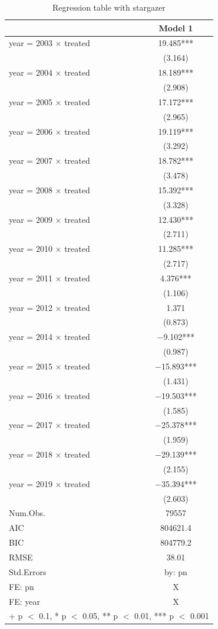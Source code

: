 \documentclass[
]{article}
\begin{document}
\begin{table}

\caption{\label{tab:table-4}Regression table with stargazer}
\centering
\begin{tabular}[t]{lc}
\toprule
  & Model 1\\
\midrule
year = 2003 × treated & \num{19.485}***\\
 & (\num{3.164})\\
year = 2004 × treated & \num{18.189}***\\
 & (\num{2.908})\\
year = 2005 × treated & \num{17.172}***\\
 & (\num{2.965})\\
year = 2006 × treated & \num{19.119}***\\
 & (\num{3.292})\\
year = 2007 × treated & \num{18.782}***\\
 & (\num{3.478})\\
year = 2008 × treated & \num{15.392}***\\
 & (\num{3.328})\\
year = 2009 × treated & \num{12.430}***\\
 & (\num{2.711})\\
year = 2010 × treated & \num{11.285}***\\
 & (\num{2.717})\\
year = 2011 × treated & \num{4.376}***\\
 & (\num{1.106})\\
year = 2012 × treated & \num{1.371}\\
 & (\num{0.873})\\
year = 2014 × treated & \num{-9.102}***\\
 & (\num{0.987})\\
year = 2015 × treated & \num{-15.893}***\\
 & (\num{1.431})\\
year = 2016 × treated & \num{-19.503}***\\
 & (\num{1.585})\\
year = 2017 × treated & \num{-25.378}***\\
 & (\num{1.959})\\
year = 2018 × treated & \num{-29.139}***\\
 & (\num{2.155})\\
year = 2019 × treated & \num{-35.394}***\\
 & (\num{2.603})\\
\midrule
Num.Obs. & \num{79557}\\
AIC & \num{804621.4}\\
BIC & \num{804779.2}\\
RMSE & \num{38.01}\\
Std.Errors & by: pn\\
FE: pn & X\\
FE: year & X\\
\bottomrule
\multicolumn{2}{l}{\rule{0pt}{1em}+ p $<$ 0.1, * p $<$ 0.05, ** p $<$ 0.01, *** p $<$ 0.001}\\
\end{tabular}
\end{table}
\end{document}
